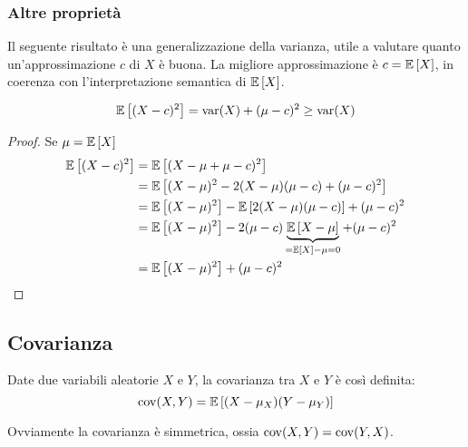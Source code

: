 \subsubsection{Altre proprietà}
Il seguente risultato è una generalizzazione della varianza, utile a valutare quanto un'approssimazione $c$ di $X$ è buona. La migliore approssimazione è $c=\mathbb{E}\left[ X \right]$, in coerenza con l'interpretazione semantica di $\mathbb{E}\left[ X \right]$.
\begin{prop}
	\begin{equation*}
		\mathbb{E}\left[ (X-c)^2 \right]=\operatorname{var}(X)+(\mu-c)^2\geq\operatorname{var}(X)
	\end{equation*}
\end{prop}
\begin{proof}
	Se $\mu=\mathbb{E}\left[ X \right]$
	\begin{align*}
		\mathbb{E}\left[ (X-c)^2 \right] & = \mathbb{E}\left[ (X-\mu+\mu-c)^2 \right]                                                     \\
		             & = \mathbb{E}\left[ (X-\mu)^2-2(X-\mu)(\mu-c)+(\mu-c)^2 \right]                                 \\
		             & = \mathbb{E}\left[ (X-\mu)^2 \right]-\mathbb{E}\left[ 2(X-\mu)(\mu-c) \right]+(\mu-c)^2                            \\
		             & = \mathbb{E}\left[ (X-\mu)^2 \right]-2(\mu-c)\underbrace{\mathbb{E}\left[ X-\mu \right]}_{=\mathbb{E}\left[ X \right]-\mu=0}+(\mu-c)^2 \\
		             & = \mathbb{E}\left[ (X-\mu)^2 \right]+(\mu-c)^2
	\end{align*}
\end{proof}



\subsection{Covarianza}

\begin{defin}
	Date due variabili aleatorie $X$ e $Y$, la covarianza tra $X$ e $Y$ è così definita:
	\begin{equation} \label{eq:covar}
		\operatorname{cov}(X,Y)=\mathbb{E}\left[ (X-\mu_X)(Y-\mu_Y) \right]
	\end{equation}
\end{defin}
\noindent
Ovviamente la covarianza è simmetrica, ossia $\operatorname{cov}(X,Y)=\operatorname{cov}(Y,X)$.


